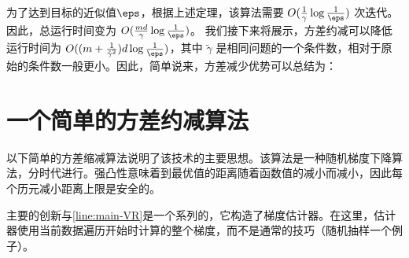 为了达到目标的近似值$\eps$，根据上述定理，该算法需要 $O(\frac{1}{\gamma} \log \frac{1}{\eps})$ 次迭代。因此，总运行时间变为 $O(\frac{md}{\gamma} \log \frac{1}{\eps})$。
我们接下来将展示，方差约减可以降低运行时间为 $O(( m + \frac{1}{\tilde{\gamma}^2} ) d \log \frac{1}{\eps})$，其中 $\tilde{\gamma}$ 是相同问题的一个条件数，相对于原始的条件数一般更小。因此，简单说来，方差减少优势可以总结为：\\
\begin{center}
\end{center}

\section{
    一个简单的方差约减算法
    } 

以下简单的方差缩减算法说明了该技术的主要思想。该算法是一种随机梯度下降算法，分时代进行。强凸性意味着到最优值的距离随着函数值的减小而减小，因此每个历元减小距离上限是安全的。

主要的创新与\ref{line:main-VR}是一个系列的，它构造了梯度估计器。在这里，估计器使用当前数据遍历开始时计算的整个梯度，而不是通常的技巧（随机抽样一个例子）。

